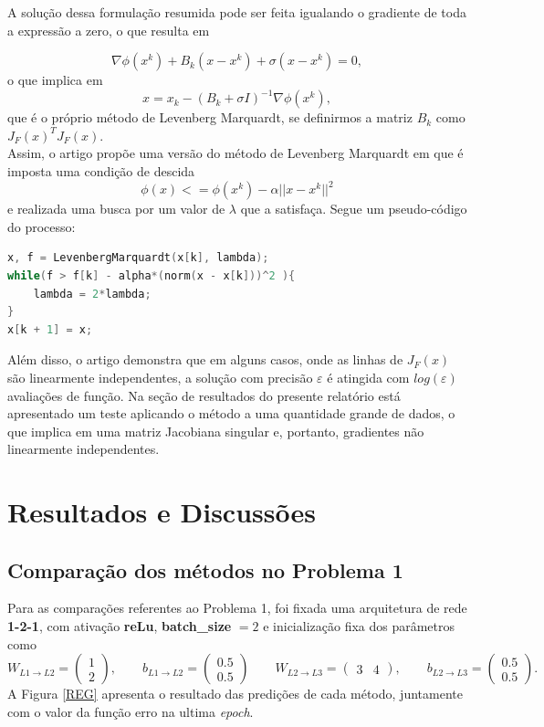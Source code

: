 \documentclass[11pt]{article}
\begin{document}
\noindent
A solução dessa formulação resumida pode ser feita igualando o gradiente de toda a expressão a zero, o que resulta em 

$$\nabla \phi(x^k) + B_k (x - x^k) + \sigma(x - x^k) = 0, $$ 
o que implica em 
$$x = x_k - (B_k + \sigma I)^{-1} \nabla \phi(x^k), $$ que é o próprio método de Levenberg Marquardt, se definirmos a matriz $B_k$ como $J_{F}(x)^T J_{F}(x)$.\\ 


\noindent
Assim, o artigo propõe uma versão do método de Levenberg Marquardt em que é imposta uma condição de descida
$$\phi(x) <= \phi(x^k) - \alpha ||x - x^k||^2$$ e realizada uma busca por um valor de $\lambda$ que a satisfaça. Segue um pseudo-código do processo:

\begin{lstlisting}[language=C, caption=Levenberg Marquardt com busca linear]
x, f = LevenbergMarquardt(x[k], lambda);
while(f > f[k] - alpha*(norm(x - x[k]))^2 ){
	lambda = 2*lambda;
}
x[k + 1] = x;
\end{lstlisting}


\noindent
Além disso, o artigo demonstra\supercite{bmLS} que em alguns casos, onde as linhas de $J_F(x)$ são linearmente independentes, a solução com precisão $\varepsilon$ é atingida com $log (\varepsilon)$ avaliações de função. Na seção de resultados do presente relatório está apresentado um teste aplicando o método a uma quantidade grande de dados, o que implica em uma matriz Jacobiana singular e, portanto, gradientes não linearmente independentes.
\newpage
\section{Resultados e Discussões}
\subsection*{Comparação dos métodos no Problema 1}
Para as comparações referentes ao Problema 1, foi fixada uma arquitetura de rede \textbf{1-2-1}, com ativação \textbf{reLu}, \textbf{batch\_size} $ = 2$ e inicialização fixa dos parâmetros como 
$$W_{L1\rightarrow L2} = \begin{pmatrix} 1 \\ 2\end{pmatrix}, \qquad b_{L1\rightarrow L2} = \begin{pmatrix} 0.5 \\ 0.5\end{pmatrix}\qquad W_{L2\rightarrow L3} = \begin{pmatrix} 3 & 4\end{pmatrix}, \qquad b_{L2\rightarrow L3} = \begin{pmatrix} 0.5 \\ 0.5\end{pmatrix}.$$ 
A Figura \ref{REG} apresenta o resultado das predições de cada método, juntamente com o valor da função erro na ultima \textit{epoch}.
\end{document}
